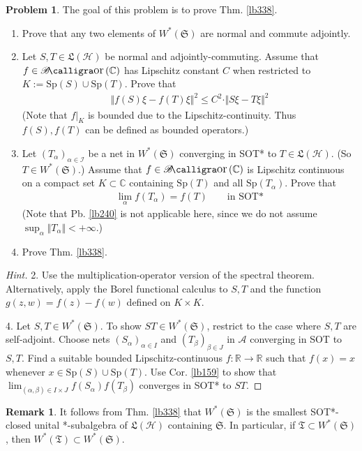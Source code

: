 \documentclass[12pt,b5paper,notitlepage]{article}
\theoremstyle{definition}
\newtheorem{rem}[df]{Remark}
\newtheorem{prob}{\color{red}Problem}[section]
\theoremstyle{plain}
\DeclareMathOperator{\Bor}{\mathscr{B}\text{\kern -2pt {\calligra\large or}}\,}
\newcommand{\fk}{\mathfrak}
\newcommand{\Cbb}{\mathbb C}
\newcommand{\Rbb}{\mathbb R}
\newcommand{\Sp}{\mathrm{Sp}}
\newcommand{\MH}{\mathcal H}
\newcommand{\SI}{\mathscr I}
\newcommand{\SA}{\mathscr A}
\numberwithin{equation}{section}
\begin{document}
\begin{prob}\label{lb341}
The goal of this problem is to prove Thm. \ref{lb338}.
\begin{enumerate}
\item Prove that any two elements of $W^*(\fk S)$ are normal and commute adjointly.
\item Let $S,T\in\fk L(\MH)$ be normal and adjointly-commuting. Assume that $f\in\Bor(\Cbb)$ has Lipschitz constant $C$ when restricted to $K:=\Sp(S)\cup\Sp(T)$. Prove that
\begin{align*}
\Vert f(S)\xi-f(T)\xi\Vert^2\leq C^2\cdot\Vert S\xi-T\xi\Vert^2
\end{align*}
(Note that $f|_K$ is bounded due to the Lipschitz-continuity. Thus $f(S),f(T)$ can be defined as bounded operators.)
\item Let $(T_\alpha)_{\alpha\in\SI}$ be a net in $W^*(\fk S)$ converging in SOT* to $T\in\fk L(\MH)$. (So $T\in W^*(\fk S)$.) Assume that $f\in\Bor(\Cbb)$ is Lipschitz continuous on a compact set $K\subset\Cbb$ containing $\Sp(T)$ and all $\Sp(T_\alpha)$. Prove that 
\begin{align*}
\lim_\alpha f(T_\alpha)=f(T)\qquad\text{in SOT*}
\end{align*}
(Note that Pb. \ref{lb240} is not applicable here, since we do not assume $\sup_\alpha\Vert T_\alpha\Vert<+\infty$.)
\item Prove Thm. \ref{lb338}.
\end{enumerate}
\end{prob}


\begin{proof}[Hint]
2. Use the multiplication-operator version of the spectral theorem. Alternatively, apply the Borel functional calculus to $S,T$ and the function $g(z,w)=f(z)-f(w)$ defined on $K\times K$.

4. Let $S,T\in W^*(\fk S)$. To show $ST\in W^*(\fk S)$, restrict to the case where $S,T$ are self-adjoint. Choose nets $(S_\alpha)_{\alpha \in I}$ and $(T_\beta)_{\beta\in J}$ in $\SA$ converging in SOT to $S,T$. Find a suitable bounded Lipschitz-continuous $f:\Rbb\rightarrow\Rbb$ such that $f(x)=x$ whenever $x\in\Sp(S)\cup \Sp(T)$. Use Cor. \ref{lb159} to show that $\lim_{(\alpha,\beta)\in I\times J}f(S_\alpha)f(T_\beta)$ converges in SOT* to $ST$.
\end{proof}


\begin{rem}
It follows from Thm. \ref{lb338} that $W^*(\fk S)$ is the smallest SOT*-closed unital *-subalgebra of $\fk L(\MH)$ containing $\fk S$. In particular, if $\fk T\subset W^*(\fk S)$, then $W^*(\fk T)\subset W^*(\fk S)$.
\end{rem}
\end{document}
